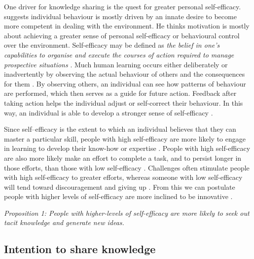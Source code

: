 One driver for knowledge sharing is the quest for greater personal self-efficacy. \citet{white1959motivation} suggests individual behaviour is mostly driven by an innate desire to become more competent in dealing with the environment. He thinks motivation is mostly about achieving a greater sense of personal self-efficacy or behavioural control over the environment. Self-efficacy may be defined as \emph{the belief in one's capabilities to organise and execute the courses of action required to manage prospective situations} \citep{bandura1994self}. Much human learning occurs either deliberately or inadvertently by observing the actual behaviour of others and the consequences for them \citep{bandura1999social}. By observing others, an individual can see how patterns of behaviour are performed, which then serves as a guide for future action. Feedback after taking action helps the individual adjust or self-correct their behaviour. In this way, an individual is able to develop a stronger sense of self-efficacy \citep{bandura1977self}. \medskip

Since self–efficacy is the extent to which an individual believes that they can master a particular skill, people with high self-efficacy are more likely to engage in learning to develop their know-how or expertise \citep{bandura1986social,gist1989influence,zimmerman2000self}. People with high self-efficacy are also more likely make an effort to complete a task, and to persist longer in those efforts, than those with low self-efficacy \citep{schunk1990goal}. Challenges often stimulate people with high self-efficacy to greater efforts, whereas someone with low self-efficacy will tend toward discouragement and giving up \citep{gist1992self,zimmerman1992self}. From this we can postulate people with higher levels of self-efficacy are more inclined to be innovative \citep{tierney2002creative,endres2007tacit}. \medskip 

\emph{Proposition 1: People with higher-levels of self-efficacy are more likely to seek out tacit knowledge and generate new ideas.}

\subsection{Intention to share knowledge}

